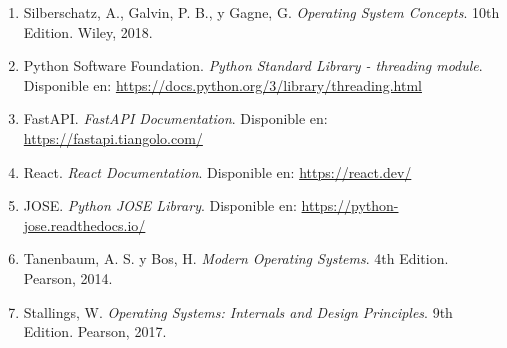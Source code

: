 \documentclass[12pt,a4paper]{article}
\begin{document}
\begin{enumerate}
    \item Silberschatz, A., Galvin, P. B., y Gagne, G. \textit{Operating System Concepts}. 10th Edition. Wiley, 2018.
    
    \item Python Software Foundation. \textit{Python Standard Library - threading module}. Disponible en: \url{https://docs.python.org/3/library/threading.html}
    
    \item FastAPI. \textit{FastAPI Documentation}. Disponible en: \url{https://fastapi.tiangolo.com/}
    
    \item React. \textit{React Documentation}. Disponible en: \url{https://react.dev/}
    
    \item JOSE. \textit{Python JOSE Library}. Disponible en: \url{https://python-jose.readthedocs.io/}
    
    \item Tanenbaum, A. S. y Bos, H. \textit{Modern Operating Systems}. 4th Edition. Pearson, 2014.
    
    \item Stallings, W. \textit{Operating Systems: Internals and Design Principles}. 9th Edition. Pearson, 2017.
\end{enumerate}
\end{document}
